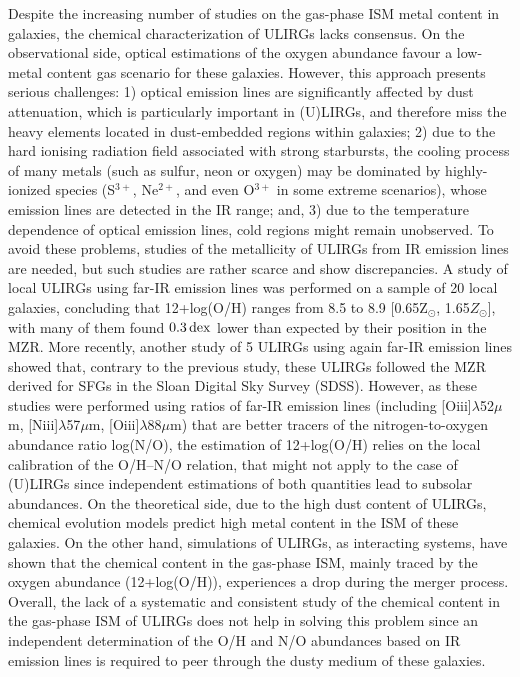 \documentclass{nature2}
\begin{document}
Despite the increasing number of studies on the gas-phase ISM metal content in galaxies, the chemical characterization of ULIRGs lacks consensus. On the observational side, optical estimations of the oxygen abundance\cite{Caputi_2008, Rupke_2008} favour a low-metal content gas scenario for these galaxies. However, this approach
presents serious challenges: 1) optical emission lines are significantly affected by dust attenuation, which is particularly important in (U)LIRGs\cite{Franceschini_2003}, and therefore miss the heavy elements located in dust-embedded regions within galaxies; 2) due to the hard ionising radiation field associated with strong starbursts, the cooling process of many metals (such as sulfur, neon or oxygen) may be dominated by highly-ionized species (S$^{3+}$, Ne$^{2+}$, and even O$^{3+}$ in some extreme scenarios), whose emission lines are detected in the IR range; and, 3) due to the temperature dependence of optical emission lines, cold regions might remain unobserved. To avoid these problems, studies of the metallicity of ULIRGs from IR emission lines are needed, but such studies are rather scarce and show discrepancies. A study of local ULIRGs using far-IR emission lines was performed on a sample of 20 local galaxies\cite{Pereira-Santaella_2017}, concluding that 12+log(O/H) ranges from 8.5 to 8.9 [0.65Z\ensuremath{_{\odot}}, 1.65\ensuremath{Z_{\odot}}], with many of them found $0.3\, \rm{dex}$ lower than expected by their position in the MZR. More recently, another study of 5 ULIRGs using again far-IR emission lines showed that, contrary to the previous study, these ULIRGs followed the MZR\cite{Chartab_2022} derived for SFGs\cite{Tremonti_2004} in the Sloan Digital Sky Survey (SDSS). However, as these studies were performed using ratios of far-IR emission lines (including [O{\sc iii}]\ensuremath{\lambda}52\ensuremath{\mu}m, [N{\sc iii}]\ensuremath{\lambda}57\ensuremath{\mu}m, [O{\sc iii}]\ensuremath{\lambda}88\ensuremath{\mu}m) that are better tracers of the nitrogen-to-oxygen abundance ratio log(N/O)\cite{Peng_2021, FO21}, the estimation of 12+log(O/H) relies on the local calibration of the O/H--N/O relation\cite{PMContini_2009, PM14}, that might not apply to the case of (U)LIRGs since independent estimations of both quantities lead to subsolar abundances\cite{FO21}. On the theoretical side, due to the high dust content\cite{Herrero-Illana_2019} of ULIRGs, chemical evolution models predict high metal content in the ISM of these galaxies\cite{Calura_2006}. On the other hand, simulations of ULIRGs, as interacting systems, have shown that the chemical content in the gas-phase ISM, mainly traced by the oxygen abundance (12+log(O/H)), experiences a drop during the merger process\cite{Montuori_2010, Rupke_2010}. Overall, the lack of a systematic and consistent study of the chemical content in the gas-phase ISM of ULIRGs does not help in solving this problem since an independent determination of the O/H and N/O abundances based on IR emission lines is required to peer through the dusty medium of these galaxies. 
\end{document}
